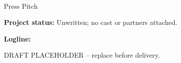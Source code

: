 \documentclass[11pt,letterpaper]{article}
\begin{document}
\begin{center}
{\Large\bfseries\sffamily \filmtitleupper}\\[6pt]
Press Pitch
\end{center}
\textbf{Project status:} Unwritten; no cast or partners attached.

\textbf{Logline:} \filmlogline

DRAFT PLACEHOLDER -- replace before delivery.
\end{document}
